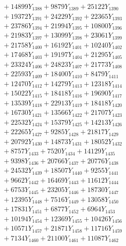 \documentclass[a4paper,10pt]{article}
\begin{document}
{\begin{align}
&\;  + 14899 Y_{1388} + 9879 Y_{1389} + 25122 Y_{1390} \\[0.3ex]
&\;  + 19372 Y_{1391} + 24229 Y_{1392} + 22365 Y_{1393} \\[0.3ex]
&\;  + 23786 Y_{1394} + 21994 Y_{1395} + 10800 Y_{1396} \\[0.3ex]
&\;  + 21983 Y_{1397} + 13099 Y_{1398} + 23061 Y_{1399} \\[0.3ex]
&\;  + 21758 Y_{1400} + 16192 Y_{1401} + 10240 Y_{1402} \\[0.3ex]
&\;  + 17468 Y_{1403} + 19197 Y_{1404} + 21295 Y_{1405} \\[0.3ex]
&\;  + 23324 Y_{1406} + 24823 Y_{1407} + 21773 Y_{1408} \\[0.5ex]\allowbreak
&\;  + 22593 Y_{1409} + 18400 Y_{1410} + 8479 Y_{1411} \\[0.3ex]
&\;  + 12470 Y_{1412} + 14279 Y_{1413} + 12318 Y_{1414} \\[0.3ex]
&\;  + 15022 Y_{1415} + 18418 Y_{1416} + 19690 Y_{1417} \\[0.3ex]
&\;  + 13539 Y_{1418} + 22913 Y_{1419} + 18418 Y_{1420} \\[0.3ex]
&\;  + 16730 Y_{1421} + 13566 Y_{1422} + 21707 Y_{1423} \\[0.3ex]
&\;  + 22532 Y_{1424} + 15379 Y_{1425} + 14213 Y_{1426} \\[0.3ex]
&\;  + 22265 Y_{1427} + 9285 Y_{1428} + 21817 Y_{1429} \\[0.3ex]
&\;  + 20792 Y_{1430} + 14873 Y_{1431} + 18052 Y_{1432} \\[0.3ex]
&\;  + 8757 Y_{1433} + 7520 Y_{1434} + 14129 Y_{1435} \\[0.3ex]
&\;  + 9398 Y_{1436} + 20766 Y_{1437} + 20776 Y_{1438} \\[0.5ex]\allowbreak
&\;  + 24532 Y_{1439} + 18507 Y_{1440} + 9255 Y_{1441} \\[0.3ex]
&\;  + 9662 Y_{1442} + 16469 Y_{1443} + 11612 Y_{1444} \\[0.3ex]
&\;  + 6753 Y_{1445} + 23205 Y_{1446} + 18730 Y_{1447} \\[0.3ex]
&\;  + 12395 Y_{1448} + 7516 Y_{1449} + 13058 Y_{1450} \\[0.3ex]
&\;  + 17831 Y_{1451} + 6877 Y_{1452} + 6964 Y_{1453} \\[0.3ex]
&\;  + 10194 Y_{1454} + 12369 Y_{1455} + 10426 Y_{1456} \\[0.3ex]
&\;  + 10571 Y_{1457} + 21871 Y_{1458} + 11716 Y_{1459} \\[0.3ex]
&\;  + 7134 Y_{1460} + 21100 Y_{1461} + 11087 Y_{1462} \\[0.3ex]

\end{align}}
\end{document}

